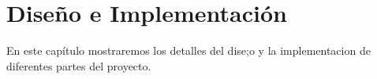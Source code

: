 \chapter{Diseño e Implementación}

En este capítulo mostraremos los detalles del dise;o y la implementacion de diferentes partes del proyecto.

